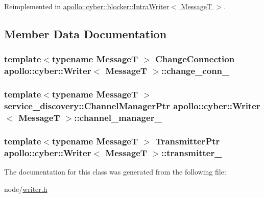 Reimplemented in \hyperlink{classapollo_1_1cyber_1_1blocker_1_1IntraWriter_a48491a940e99954b19c7eb26710d04b8}{apollo\-::cyber\-::blocker\-::\-Intra\-Writer$<$ Message\-T $>$}.



\subsection{Member Data Documentation}
\hypertarget{classapollo_1_1cyber_1_1Writer_ab63e17387ddc574686cfcae2864e766a}{
\subsubsection[{change\-\_\-conn\-\_\-}]{\setlength{\rightskip}{0pt plus 5cm}template$<$typename Message\-T $>$ {\bf Change\-Connection} {\bf apollo\-::cyber\-::\-Writer}$<$ Message\-T $>$\-::change\-\_\-conn\-\_\-\hspace{0.3cm}{\ttfamily [private]}}}\label{classapollo_1_1cyber_1_1Writer_ab63e17387ddc574686cfcae2864e766a}
\hypertarget{classapollo_1_1cyber_1_1Writer_a653e7f4679f7849d9d523f27997baa54}{
\subsubsection[{channel\-\_\-manager\-\_\-}]{\setlength{\rightskip}{0pt plus 5cm}template$<$typename Message\-T $>$ {\bf service\-\_\-discovery\-::\-Channel\-Manager\-Ptr} {\bf apollo\-::cyber\-::\-Writer}$<$ Message\-T $>$\-::channel\-\_\-manager\-\_\-\hspace{0.3cm}{\ttfamily [private]}}}\label{classapollo_1_1cyber_1_1Writer_a653e7f4679f7849d9d523f27997baa54}
\hypertarget{classapollo_1_1cyber_1_1Writer_a0aba4d006319cb00a54999abbdb22395}{
\subsubsection[{transmitter\-\_\-}]{\setlength{\rightskip}{0pt plus 5cm}template$<$typename Message\-T $>$ {\bf Transmitter\-Ptr} {\bf apollo\-::cyber\-::\-Writer}$<$ Message\-T $>$\-::transmitter\-\_\-\hspace{0.3cm}{\ttfamily [private]}}}\label{classapollo_1_1cyber_1_1Writer_a0aba4d006319cb00a54999abbdb22395}


The documentation for this class was generated from the following file\-:\begin{DoxyCompactItemize}
\item 
node/\hyperlink{writer_8h}{writer.\-h}\end{DoxyCompactItemize}
